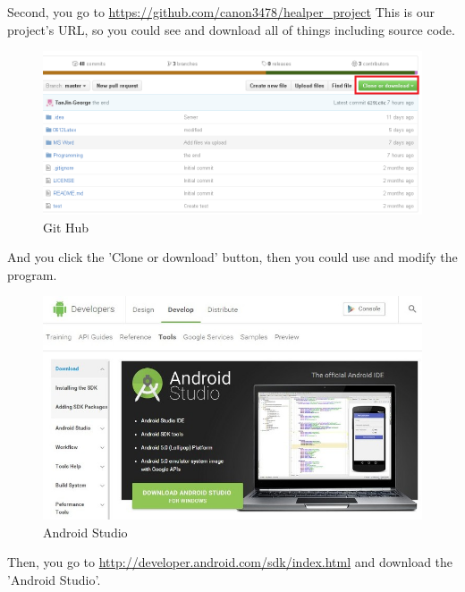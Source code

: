 \documentclass[conference]{IEEEtran}
\begin{document}
Second, you go to \url{https://github.com/canon3478/healper_project} 
This is our project's URL, so you could see and download all of things including source code.

\begin{figure}[H]
\begin{center}
    \includegraphics[scale=0.33]{git3}
    \caption{Git Hub} 
\end{center}
\end{figure}

And you click the 'Clone or download' button, then you could use and modify the program.

\begin{figure}[H]
\begin{center}
    \includegraphics[scale=0.33]{android1}
    \caption{Android Studio} 
\end{center}
\end{figure}

Then, you go to 
\url{http://developer.android.com/sdk/index.html}
 and download the 'Android Studio'.
\end{document}

